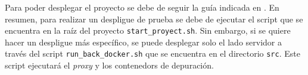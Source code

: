 Para poder desplegar el proyecto se debe de seguir la guía indicada en .
En resumen, para realizar un despligue de prueba se debe de ejecutar el script que se encuentra en la raíz del proyecto \texttt{start\_proyect.sh}. Sin embargo, si se quiere hacer un despligue más específico, se puede desplegar solo el lado servidor a través del script \texttt{run\_back\_docker.sh} que se encuentra en el directorio \texttt{src}. Este script ejecutará el \textit{\gls{proxy}} y los \glspl{contenedor} de depuración.